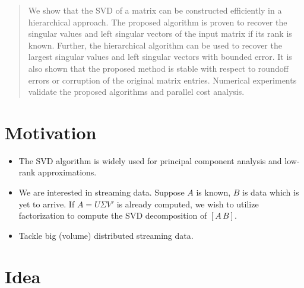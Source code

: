 \documentclass[a0,landscape]{a0poster}
\begin{document}
\vspace{1cm} %


\begin{multicols}{4} %


\begin{abstract}
  We show that the SVD of a matrix can be constructed efficiently in a
  hierarchical approach. The proposed algorithm is proven to recover
  the singular values and left singular vectors of the input matrix 
  if its rank is known. Further, the hierarchical algorithm can be
  used to recover the largest singular values and left singular
  vectors with bounded error. It is also shown that the proposed
  method is stable with respect to roundoff errors or corruption of
  the original matrix entries. Numerical experiments validate the
  proposed algorithms and parallel cost analysis.
\end{abstract}


\section*{Motivation}
\begin{itemize}[noitemsep]
\item The SVD algorithm is widely used for principal component
  analysis and low-rank approximations.
\item We are interested in streaming data.  Suppose $A$ is known, $B$
  is data which is yet to arrive.  If $A=U\Sigma V'$ is already
  computed, we wish to utilize factorization to compute the SVD
  decomposition of $[A\, B]$.
\item Tackle big (volume) distributed streaming data.
\end{itemize}

\section*{Idea}


\end{multicols}
\end{document}
